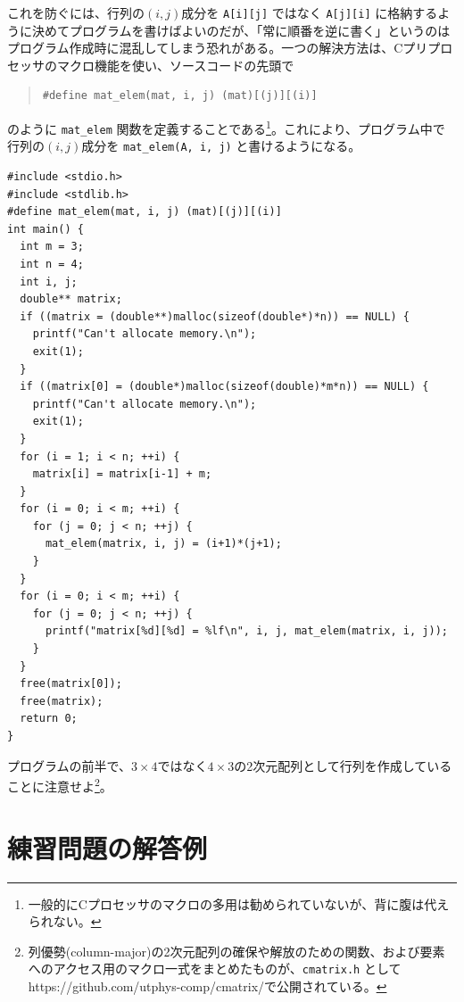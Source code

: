 これを防ぐには、行列の$(i,j)$成分を \verb|A[i][j]| ではなく \verb|A[j][i]| に格納するように決めてプログラムを書けばよいのだが、「常に順番を逆に書く」というのはプログラム作成時に混乱してしまう恐れがある。一つの解決方法は、Cプリプロセッサのマクロ機能を使い、ソースコードの先頭で
\begin{quote}
\begin{verbatim}
#define mat_elem(mat, i, j) (mat)[(j)][(i)]
\end{verbatim}
\end{quote}
のように \verb|mat_elem| 関数を定義することである\footnote{一般的にCプロセッサのマクロの多用は勧められていないが、背に腹は代えられない。}。これにより、プログラム中で行列の$(i,j)$成分を \verb|mat_elem(A, i, j)| と書けるようになる。
\begin{reidai}\label{ex:malloc-2dim-column-major}
\begin{verbatim}
#include <stdio.h>
#include <stdlib.h>
#define mat_elem(mat, i, j) (mat)[(j)][(i)]
int main() {
  int m = 3;
  int n = 4;
  int i, j;
  double** matrix;
  if ((matrix = (double**)malloc(sizeof(double*)*n)) == NULL) {
    printf("Can't allocate memory.\n");
    exit(1);
  }
  if ((matrix[0] = (double*)malloc(sizeof(double)*m*n)) == NULL) {
    printf("Can't allocate memory.\n");
    exit(1);
  }
  for (i = 1; i < n; ++i) {
    matrix[i] = matrix[i-1] + m;
  }
  for (i = 0; i < m; ++i) {
    for (j = 0; j < n; ++j) {
      mat_elem(matrix, i, j) = (i+1)*(j+1);
    }
  }
  for (i = 0; i < m; ++i) {
    for (j = 0; j < n; ++j) {
      printf("matrix[%d][%d] = %lf\n", i, j, mat_elem(matrix, i, j));
    }
  }
  free(matrix[0]);
  free(matrix);
  return 0;
}
\end{verbatim}
\end{reidai} \noindent
プログラムの前半で、$3 \times 4$ではなく$4 \times 3$の2次元配列として行列を作成していることに注意せよ\footnote{列優勢(column-major)の2次元配列の確保や解放のための関数、および要素へのアクセス用のマクロ一式をまとめたものが、{\tt cmatrix.h} として{https://github.com/utphys-comp/cmatrix/}で公開されている。}。

\section{練習問題の解答例}

